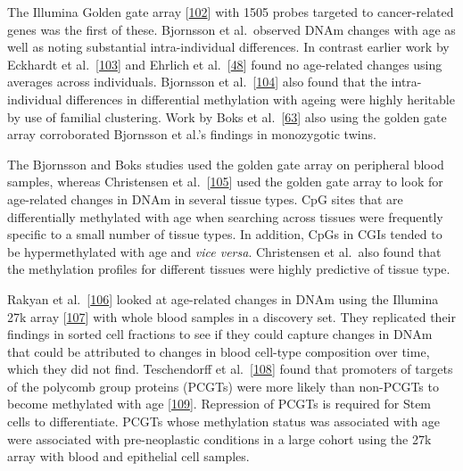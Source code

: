 \documentclass[
]{book}
\begin{document}
The Illumina Golden gate array {[}\protect\hyperlink{ref-Bibikova2006}{102}{]} with 1505 probes targeted to cancer-related genes was the first of these.
Bjornsson et al.~observed DNAm changes with age as well as noting substantial intra-individual differences.
In contrast earlier work by Eckhardt et al.~{[}\protect\hyperlink{ref-Eckhardt2006}{103}{]} and Ehrlich et al.~{[}\protect\hyperlink{ref-Ehrlich1982}{48}{]} found no age-related changes using averages across individuals.
Bjornsson et al.~{[}\protect\hyperlink{ref-Bjornsson2008}{104}{]} also found that the intra-individual differences in differential methylation with ageing were highly heritable by use of familial clustering.
Work by Boks et al.~{[}\protect\hyperlink{ref-Boks2009}{63}{]} also using the golden gate array corroborated Bjornsson et al.'s findings in monozygotic twins.

The Bjornsson and Boks studies used the golden gate array on peripheral blood samples, whereas Christensen et al.~{[}\protect\hyperlink{ref-Christensen2009}{105}{]} used the golden gate array to look for age-related changes in DNAm in several tissue types.
CpG sites that are differentially methylated with age when searching across tissues were frequently specific to a small number of tissue types.
In addition, CpGs in CGIs tended to be hypermethylated with age and \emph{vice versa}.
Christensen et al.~also found that the methylation profiles for different tissues were highly predictive of tissue type.

Rakyan et al.~{[}\protect\hyperlink{ref-Rakyan2010}{106}{]} looked at age-related changes in DNAm using the Illumina 27k array {[}\protect\hyperlink{ref-Bibikova2009}{107}{]} with whole blood samples in a discovery set.
They replicated their findings in sorted cell fractions to see if they could capture changes in DNAm that could be attributed to changes in blood cell-type composition over time, which they did not find.
Teschendorff et al.~{[}\protect\hyperlink{ref-Teschendorff2010}{108}{]} found that promoters of targets of the polycomb group proteins (PCGTs) were more likely than non-PCGTs to become methylated with age {[}\protect\hyperlink{ref-Jung2015}{109}{]}.
Repression of PCGTs is required for Stem cells to differentiate.
PCGTs whose methylation status was associated with age were associated with pre-neoplastic conditions in a large cohort using the 27k array with blood and epithelial cell samples.
\end{document}

